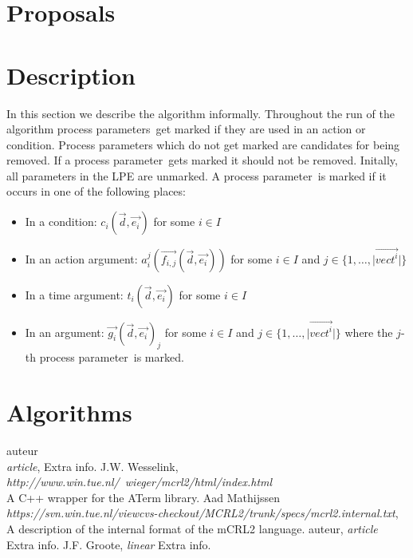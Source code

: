 \documentclass[a4paper,10pt]{article}
\theoremstyle{plain}
\theoremstyle{definition}
\newcommand{\ovr}{\overrightarrow}
\newcommand{\pp}{process parameter}
\newcommand{\pps}{process parameters}
\begin{document}
\section{Proposals}

\section{Description}
In this section we describe the algorithm informally. Throughout the run of the algorithm \pps\ get marked if they are used in an action or condition. Process parameters which do not get marked are candidates for being removed. If a \pp\ gets marked it should not be removed. Initally, all parameters in the LPE are unmarked. A \pp\ is marked if it occurs in one of the following places:

\begin{itemize}
\item In a condition: $c_i(\ovr{d},\ovr{e_i})$ for some $i \in I$
\item In an action argument: $a_i^j(\ovr{f_{i,j}}(\ovr{d},\ovr{e_i}))$ for some $i \in I$ and $j \in \lbrace 1, \ldots , \vert \ovr{vect^i} \vert \rbrace$
\item In a time argument: $t_i(\ovr{d},\ovr{e_i})$ for some $i \in I$
\item In an argument: $\ovr{g_i}(\ovr{d},\ovr{e_i})_j$ for some $i \in I$ and $j \in \lbrace 1, \ldots , \vert \ovr{vect^i} \vert \rbrace$ where the $j$-th \pp\ is marked.

\end{itemize}

\section{Algorithms} \label{sec:alg}

\begin{thebibliography}{99}   auteur\\
   \textit{article},
   Extra info.
   J.W. Wesselink,
   \textit{http://www.win.tue.nl/~wieger/mcrl2/html/index.html}\\
   A C++ wrapper for the ATerm library.
 Aad Mathijssen\\
   \textit{https://svn.win.tue.nl/viewcvs-checkout/MCRL2/trunk/specs/mcrl2.internal.txt},
   A description of the internal format of the mCRL2 language.
   auteur,
   \textit{article}
   Extra info.
   J.F. Groote,
   \textit{linear}
   Extra info.

\end{thebibliography}
\end{document}
